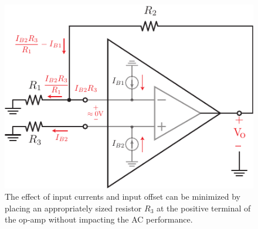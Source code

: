 \begin{figure}[t]
\centering
\includegraphics[scale=1.5]{opamp_offset_reduce}
\caption{The effect of input currents and input offset can be minimized by placing an appropriately sized resistor $R_3$ at the positive terminal of the op-amp without impacting the AC performance.} \label{fig:opamp_offset_reduce}
\end{figure}
